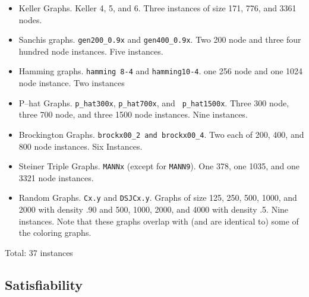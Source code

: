\begin{itemize}
\item Keller Graphs.  Keller 4, 5, and 6.  Three instances of size
  171, 776, and 3361 nodes.

\item Sanchis graphs.  {\tt gen200\_0.9x} and {\tt gen400\_0.9x}.
  Two 200 node and three four hundred node instances. Five instances.

\item Hamming graphs.  {\tt hamming 8-4} and {\tt hamming10-4}.  one
  256 node and one 1024 node instance. Two instances

\item P--hat Graphs.  {\tt p\_hat300x}, {\tt p\_hat700x}, and {\tt
    p\_hat1500x}.  Three 300 node, three 700 node, and three 1500 node
  instances. Nine instances.

\item Brockington Graphs. {\tt brockx00\_2 and brockx00\_4}.  Two each
  of 200, 400, and 800 node instances. Six Instances.

\item Steiner Triple Graphs. {\tt MANNx} (except for {\tt MANN9}).
  One 378, one 1035, and one 3321 node instances.

\item Random Graphs.  {\tt Cx.y} and {\tt DSJCx.y}. Graphs of size
  125, 250, 500, 1000, and 2000 with density .90 and 500, 1000, 2000,
  and 4000 with density .5. Nine instances.  Note that these graphs
  overlap with (and are identical to) some of the coloring graphs.

\end{itemize}

Total: 37 instances


\subsection{Satisfiability}

